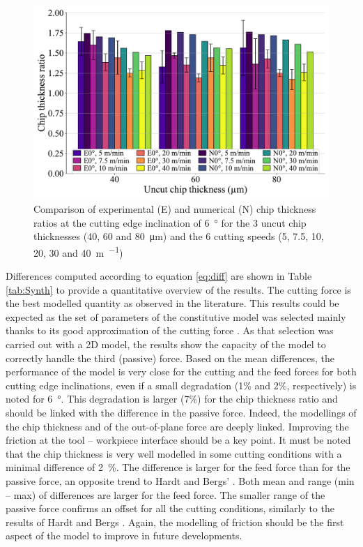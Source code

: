 \documentclass[preprint,12pt,times]{elsarticle}
\begin{document}
\begin{figure}[!h]
\centering
\includegraphics[width = 140 mm]{Figures/h6}
\caption{Comparison of experimental (E) and numerical (N) chip thickness ratios at the cutting edge inclination of \qty{6}{\degree} for the 3 uncut chip thicknesses (40, 60 and \qty{80}{\um}) and the 6 cutting speeds (5, 7.5, 10, 20, 30 and \qty{40}{\m\per\min})}
\label{fig:h6}
\end{figure}

Differences computed according to equation \ref{eq:diff} are shown in Table \ref{tab:Synth} to provide a quantitative overview of the results. The cutting force is the best modelled quantity as observed in the literature. This results could be expected as the set of parameters of the constitutive model was selected mainly thanks to its good approximation of the cutting force \cite{ducobu_Importance_2017}. As that selection was carried out with a 2D model, the results show the capacity of the model to correctly handle the third (passive) force. Based on the mean differences, the performance of the model is very close for the cutting and the feed forces for both cutting edge inclinations, even if a small degradation (1\% and 2\%, respectively) is noted for \qty{6}{\degree}. This degradation is larger (7\%) for the chip thickness ratio and should be linked with the difference in the passive force. Indeed, the modellings of the chip thickness and of the out-of-plane force are deeply linked. Improving the friction at the tool -- workpiece interface should be a key point. It must be noted that the chip thickness is very well modelled in some cutting conditions with a minimal difference of \qty{2}{\%}. The difference is larger for the feed force than for the passive force, an opposite trend to Hardt and Bergs' \cite{hardt_Three_2021}. Both mean and range (min -- max) of differences are larger for the feed force. The smaller range of the passive force confirms an offset for all the cutting conditions, similarly to the results of Hardt and Bergs \cite{hardt_Three_2021}. Again, the modelling of friction should be the first aspect of the model to improve in future developments.
\end{document}

